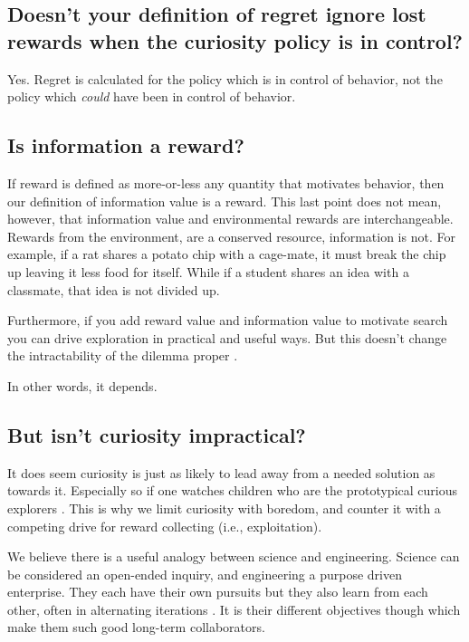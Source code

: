 \subsection*{Doesn't your definition of regret ignore lost rewards when the curiosity policy is in control?}
Yes. Regret is calculated for the policy which is in control of behavior, not the policy which \textit{could} have been in control of behavior.


\subsection*{Is information a reward?}
If reward is defined as more-or-less any quantity that motivates behavior, then our definition of information value is a reward. This last point does not mean, however, that information value and environmental rewards are interchangeable. Rewards from the environment, are a conserved resource, information is not. For example, if a rat shares a potato chip with a cage-mate, it must break the chip up leaving it less food for itself. While if a student shares an idea with a classmate, that idea is not divided up. 

Furthermore, if you add reward value and information value to motivate search you can drive exploration in practical and useful ways. But this doesn't change the intractability of the dilemma proper \cite{Thrun1992a,Dayan1996,Findling2018,Gershman2018b}. 

In other words, it depends. 


\subsection*{But isn't curiosity impractical?}
It does seem curiosity is just as likely to lead away from a needed solution as towards it. Especially so if one watches children who are the prototypical curious explorers \cite{Sumner2019,Kidd2015}. This is why we limit curiosity with boredom, and counter it with a competing drive for reward collecting (i.e., exploitation). 

We believe there is a useful analogy between science and engineering. Science can be considered an open-ended inquiry, and engineering a purpose driven enterprise. They each have their own pursuits but they also learn from each other, often in alternating iterations \cite{Gupta2006}. It is their different objectives though which make them such good long-term collaborators.


